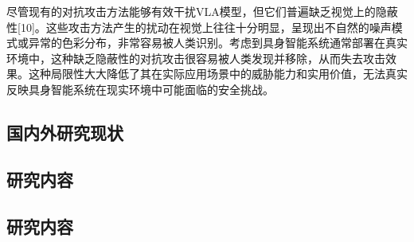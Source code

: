 尽管现有的对抗攻击方法能够有效干扰VLA模型，但它们普遍缺乏视觉上的隐蔽性[10]。这些攻击方法产生的扰动在视觉上往往十分明显，呈现出不自然的噪声模式或异常的色彩分布，非常容易被人类识别。考虑到具身智能系统通常部署在真实环境中，这种缺乏隐蔽性的对抗攻击很容易被人类发现并移除，从而失去攻击效果。这种局限性大大降低了其在实际应用场景中的威胁能力和实用价值，无法真实反映具身智能系统在现实环境中可能面临的安全挑战。




\cite{huangResearchU2019}	%


\subsection{国内外研究现状}

\subsection{研究内容}

\subsection{研究内容}

